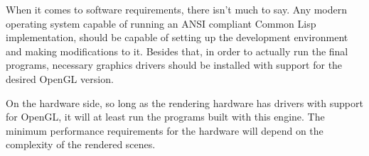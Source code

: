 
\label{SEC:REQS}

When it comes to software requirements,
there isn't much to say.
Any modern operating system capable of running an ANSI compliant Common Lisp implementation,
should be capable of setting up the development environment and making modifications to it.
Besides that,
in order to actually run the final programs,
necessary graphics drivers should be installed with support for the desired OpenGL version.

On the hardware side,
so long as the rendering hardware has drivers with support for OpenGL,
it will at least run the programs built with this engine.
The minimum performance requirements for the hardware will depend on the complexity of the rendered scenes.
